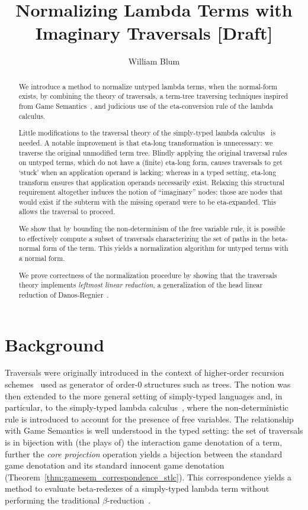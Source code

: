 \documentclass{article}
\author{William Blum}
\title{Normalizing Lambda Terms with Imaginary Traversals [Draft]}
\theoremstyle{definition}
\begin{document}
\maketitle
\begin{abstract}
We introduce a method to normalize untyped lambda terms, when the normal-form exists, by combining the theory of traversals, a term-tree traversing techniques inspired from Game Semantics~\cite{Ong2006,BlumPhd}, and judicious use of the eta-conversion rule of the lambda calculus.

Little modifications to the traversal theory of the simply-typed lambda calculus~\cite{BlumPhd} is needed. A notable improvement is that eta-long transformation is unnecessary: we traverse the original unmodified term tree. Blindly applying the original traversal rules on untyped terms, which do not have a (finite) eta-long form, causes traversals to get `stuck' when an application operand is lacking; whereas in a typed setting, eta-long transform ensures that application operands necessarily exist. Relaxing this structural requirement altogether induces the notion of ``imaginary'' nodes: those are nodes that would exist
 if the subterm with the missing operand were to be eta-expanded. This allows the traversal to proceed.

We show that by bounding the non-determinism of the free variable rule, it is possible to effectively compute a subset of traversals characterizing the set of paths in the beta-normal form of the term. This yields a normalization algorithm for untyped terms with a normal form.

We prove correctness of the normalization procedure by showing that the traversals theory implements \emph{leftmost linear reduction}, a generalization of the head linear reduction of Danos-Regnier~\cite{danos-head}.
\end{abstract}

\section{Background}

Traversals were originally introduced in the context of higher-order recursion schemes~\cite{Ong2006} used as generator of order-$0$ structures such as trees.
The notion was then extended to the more general setting of simply-typed languages and, in particular, to the simply-typed lambda calculus~\cite{BlumPhd}, where the non-deterministic rule  is introduced to account for the presence of free variables. The relationship with Game Semantics is well understood in the typed setting: the set of traversals is in bijection with (the plays of) the interaction game denotation of a term, further the \emph{core projection} operation yields a bijection between the standard game denotation and its standard innocent game denotation (Theorem~\ref{thm:gamesem_correspondence_stlc}). This correspondence yields a method to evaluate beta-redexes of a simply-typed lambda term without performing the traditional $\beta$-reduction~\cite{danos-head,BlumPhd,BlumGalop2008, Blum-LocalBeta2008}.
\end{document}
